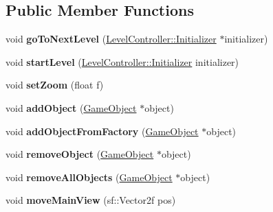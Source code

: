 \subsection*{Public Member Functions}
\begin{DoxyCompactItemize}
\item 
\hypertarget{class_level_controller_a9cb1f95fee01739d9658801dfebb43b1}{void {\bfseries go\+To\+Next\+Level} (\hyperlink{class_level_controller_1_1_initializer}{Level\+Controller\+::\+Initializer} $\ast$initializer)}\label{class_level_controller_a9cb1f95fee01739d9658801dfebb43b1}

\item 
\hypertarget{class_level_controller_a0b8f10e66f7b97615c92340e10f77a07}{void {\bfseries start\+Level} (\hyperlink{class_level_controller_1_1_initializer}{Level\+Controller\+::\+Initializer} initializer)}\label{class_level_controller_a0b8f10e66f7b97615c92340e10f77a07}

\item 
\hypertarget{class_level_controller_a1235128f78023483b022bab8e2b0125c}{void {\bfseries set\+Zoom} (float f)}\label{class_level_controller_a1235128f78023483b022bab8e2b0125c}

\item 
\hypertarget{class_level_controller_a230987fb618cc9949974a4f4b994bbc1}{void {\bfseries add\+Object} (\hyperlink{class_game_object}{Game\+Object} $\ast$object)}\label{class_level_controller_a230987fb618cc9949974a4f4b994bbc1}

\item 
\hypertarget{class_level_controller_afd60c294955bc06dafac9f5ea146c53d}{void {\bfseries add\+Object\+From\+Factory} (\hyperlink{class_game_object}{Game\+Object} $\ast$object)}\label{class_level_controller_afd60c294955bc06dafac9f5ea146c53d}

\item 
\hypertarget{class_level_controller_ad8894683730d484c0ba359c0ee88b219}{void {\bfseries remove\+Object} (\hyperlink{class_game_object}{Game\+Object} $\ast$object)}\label{class_level_controller_ad8894683730d484c0ba359c0ee88b219}

\item 
\hypertarget{class_level_controller_a3f33f48f2476ad4a68ad5880ea02db22}{void {\bfseries remove\+All\+Objects} (\hyperlink{class_game_object}{Game\+Object} $\ast$object)}\label{class_level_controller_a3f33f48f2476ad4a68ad5880ea02db22}

\item 
\hypertarget{class_level_controller_abd5d6b2ae138b8e086e890fddf46ccef}{void {\bfseries move\+Main\+View} (sf\+::\+Vector2f pos)}\label{class_level_controller_abd5d6b2ae138b8e086e890fddf46ccef}


\end{DoxyCompactItemize}
